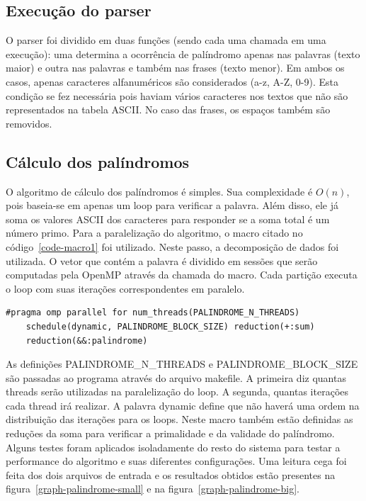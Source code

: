 \documentclass[a4paper]{article}
\begin{document}
\subsection{Execução do parser}
\indent \indent O parser foi dividido em duas funções (sendo cada uma chamada em uma execução): uma determina a ocorrência de palíndromo apenas nas palavras (texto maior) e outra nas palavras e também nas frases (texto menor). Em ambos os casos, apenas caracteres alfanuméricos são considerados (a-z, A-Z, 0-9). Esta condição se fez necessária pois haviam vários caracteres nos textos que não são representados na tabela ASCII. No caso das frases, os espaços também são removidos.

\subsection{Cálculo dos palíndromos}
\indent \indent O algoritmo de cálculo dos palíndromos é simples. Sua complexidade é \begin{math}O(n)\end{math}, pois baseia-se em apenas um loop para verificar a palavra. Além disso, ele já soma os valores ASCII dos caracteres para responder se a soma total é um número primo. Para a paralelização do algoritmo, o macro citado no código~\ref{code-macro1} foi utilizado. Neste passo, a decomposição de dados foi utilizada. O vetor que contém a palavra é dividido em sessões que serão computadas pela OpenMP através da chamada do macro. Cada partição executa o loop com suas iterações correspondentes em paralelo.
\begin{lstlisting}[caption=Macro que paraleliza o algoritmo do palíndromo, label=code-macro1]
#pragma omp parallel for num_threads(PALINDROME_N_THREADS) 
	schedule(dynamic, PALINDROME_BLOCK_SIZE) reduction(+:sum) 
	reduction(&&:palindrome)
\end{lstlisting}
\indent \indent As definições PALINDROME\_N\_THREADS e PALINDROME\_BLOCK\_SIZE são passadas ao programa através do arquivo makefile. A primeira diz quantas threads serão utilizadas na paralelização do loop. A segunda, quantas iterações cada thread irá realizar. A palavra dynamic define que não haverá uma ordem na distribuição das iterações para os loops. Neste macro também estão definidas as reduções da soma para verificar a primalidade e da validade do palíndromo.\\
\indent Alguns testes foram aplicados isoladamente do resto do sistema para testar a performance do algoritmo e suas diferentes configurações. Uma leitura cega foi feita dos dois arquivos de entrada e os resultados obtidos estão presentes na figura~\ref{graph-palindrome-small} e na figura~\ref{graph-palindrome-big}.
\end{document}
